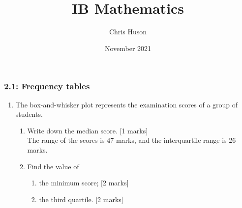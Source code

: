 \documentclass[12pt, twoside]{article}
\title{IB Mathematics}
\author{Chris Huson}
\date{November 2021}
\begin{document}
\subsubsection*{2.1: Frequency tables}
\begin{enumerate}
\item The box-and-whisker plot represents the examination scores of a group of students.
  \begin{center}
  \end{center}

  \begin{enumerate}
    \item Write down the median score. \hfill [1 marks]\\[.25cm]
    The range of the scores is 47 marks, and the interquartile range is 26 marks.
    \item Find the value of
    \begin{enumerate}
      \item the minimum score; \hfill [2 marks] \vspace{.5cm}
      \item the third quartile. \hfill [2 marks] \vspace{.5cm}
    \end{enumerate}
  \end{enumerate}


\end{enumerate}
\end{document}
